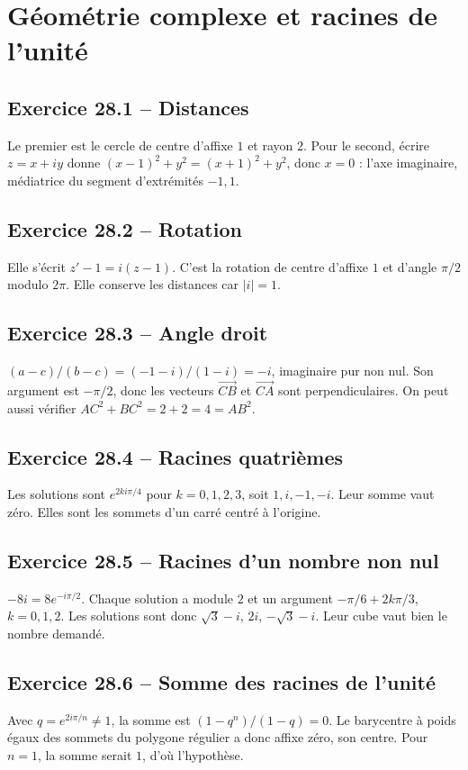 \chapter{Géométrie complexe et racines de l’unité}
\section*{Exercice 28.1 -- Distances}
Le premier est le cercle de centre d'affixe $1$ et rayon $2$. Pour le second, écrire $z=x+i y$ donne $(x-1)^2+y^2=(x+1)^2+y^2$, donc $x=0$ : l'axe imaginaire, médiatrice du segment d'extrémités $-1,1$.

\section*{Exercice 28.2 -- Rotation}
Elle s'écrit $z'-1=i(z-1)$. C'est la rotation de centre d'affixe $1$ et d'angle $\pi/2$ modulo $2\pi$. Elle conserve les distances car $|i|=1$.

\section*{Exercice 28.3 -- Angle droit}
$(a-c)/(b-c)=(-1-i)/(1-i)=-i$, imaginaire pur non nul. Son argument est $-\pi/2$, donc les vecteurs $\overrightarrow{CB}$ et $\overrightarrow{CA}$ sont perpendiculaires. On peut aussi vérifier $AC^2+BC^2=2+2=4=AB^2$.

\section*{Exercice 28.4 -- Racines quatrièmes}
Les solutions sont $e^{2ki\pi/4}$ pour $k=0,1,2,3$, soit $1,i,-1,-i$. Leur somme vaut zéro. Elles sont les sommets d'un carré centré à l'origine.

\section*{Exercice 28.5 -- Racines d’un nombre non nul}
$-8i=8e^{-i\pi/2}$. Chaque solution a module $2$ et un argument $-\pi/6+2k\pi/3$, $k=0,1,2$. Les solutions sont donc $\sqrt3-i$, $2i$, $-\sqrt3-i$. Leur cube vaut bien le nombre demandé.

\section*{Exercice 28.6 -- Somme des racines de l’unité}
Avec $q=e^{2i\pi/n}\ne1$, la somme est $(1-q^n)/(1-q)=0$. Le barycentre à poids égaux des sommets du polygone régulier a donc affixe zéro, son centre. Pour $n=1$, la somme serait $1$, d'où l'hypothèse.
